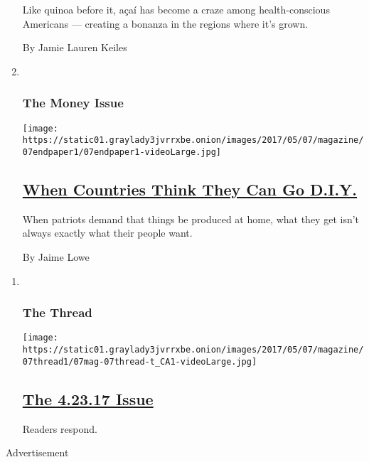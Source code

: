 \begin{enumerate}
  Like quinoa before it, açaí has become a craze among health-conscious
  Americans --- creating a bonanza in the regions where it's grown.

  By Jamie Lauren Keiles
\item ~
  \hypertarget{the-money-issue-9}{%
  \subsubsection{The Money Issue}\label{the-money-issue-9}}

  \texttt{[image: https://static01.graylady3jvrrxbe.onion/images/2017/05/07/magazine/07endpaper1/07endpaper1-videoLarge.jpg]}

  \hypertarget{when-countries-think-they-can-go-diy}{%
  \subsection{\texorpdfstring{\href{/2017/05/05/magazine/when-countries-think-they-can-go-diy.html}{When
  Countries Think They Can Go
  D.I.Y.}}{When Countries Think They Can Go D.I.Y.}}\label{when-countries-think-they-can-go-diy}}

  When patriots demand that things be produced at home, what they get
  isn't always exactly what their people want.

  By Jaime Lowe
\end{enumerate}

\begin{enumerate}
\def\labelenumi{\arabic{enumi}.}
\item ~
  \hypertarget{the-thread}{%
  \subsubsection{The Thread}\label{the-thread}}

  \texttt{[image: https://static01.graylady3jvrrxbe.onion/images/2017/05/07/magazine/07thread1/07mag-07thread-t\_CA1-videoLarge.jpg]}

  \hypertarget{the-42317-issue}{%
  \subsection{\texorpdfstring{\href{/2017/05/05/magazine/the-4-23-17-issue.html}{The
  4.23.17 Issue}}{The 4.23.17 Issue}}\label{the-42317-issue}}

  Readers respond.
\end{enumerate}

Advertisement


